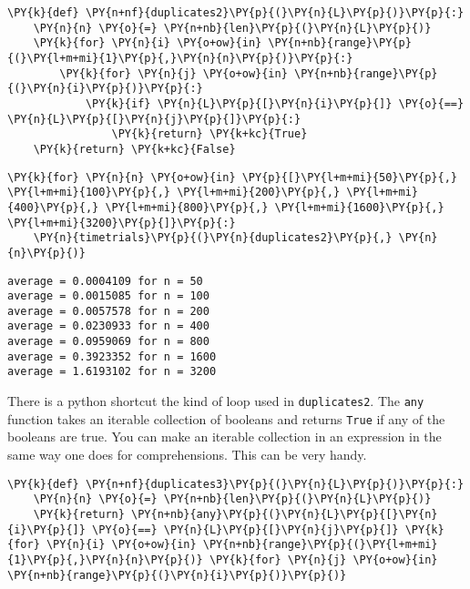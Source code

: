 \begin{Verbatim}[commandchars=\\\{\}]
\PY{k}{def} \PY{n+nf}{duplicates2}\PY{p}{(}\PY{n}{L}\PY{p}{)}\PY{p}{:}
    \PY{n}{n} \PY{o}{=} \PY{n+nb}{len}\PY{p}{(}\PY{n}{L}\PY{p}{)}
    \PY{k}{for} \PY{n}{i} \PY{o+ow}{in} \PY{n+nb}{range}\PY{p}{(}\PY{l+m+mi}{1}\PY{p}{,}\PY{n}{n}\PY{p}{)}\PY{p}{:}
        \PY{k}{for} \PY{n}{j} \PY{o+ow}{in} \PY{n+nb}{range}\PY{p}{(}\PY{n}{i}\PY{p}{)}\PY{p}{:}
            \PY{k}{if} \PY{n}{L}\PY{p}{[}\PY{n}{i}\PY{p}{]} \PY{o}{==} \PY{n}{L}\PY{p}{[}\PY{n}{j}\PY{p}{]}\PY{p}{:}
                \PY{k}{return} \PY{k+kc}{True}
    \PY{k}{return} \PY{k+kc}{False}
\end{Verbatim}



\begin{Verbatim}[commandchars=\\\{\}]
\PY{k}{for} \PY{n}{n} \PY{o+ow}{in} \PY{p}{[}\PY{l+m+mi}{50}\PY{p}{,} \PY{l+m+mi}{100}\PY{p}{,} \PY{l+m+mi}{200}\PY{p}{,} \PY{l+m+mi}{400}\PY{p}{,} \PY{l+m+mi}{800}\PY{p}{,} \PY{l+m+mi}{1600}\PY{p}{,} \PY{l+m+mi}{3200}\PY{p}{]}\PY{p}{:}
    \PY{n}{timetrials}\PY{p}{(}\PY{n}{duplicates2}\PY{p}{,} \PY{n}{n}\PY{p}{)}
\end{Verbatim}

\begin{Verbatim}
average = 0.0004109 for n = 50
average = 0.0015085 for n = 100
average = 0.0057578 for n = 200
average = 0.0230933 for n = 400
average = 0.0959069 for n = 800
average = 0.3923352 for n = 1600
average = 1.6193102 for n = 3200

\end{Verbatim}


There is a python shortcut the kind of loop used in \texttt{duplicates2}.
The \texttt{any} function takes an iterable collection of booleans and returns \texttt{True} if any of the booleans are true.
You can make an iterable collection in an expression in the same way one does for comprehensions.
This can be very handy.

\begin{Verbatim}[commandchars=\\\{\}]
\PY{k}{def} \PY{n+nf}{duplicates3}\PY{p}{(}\PY{n}{L}\PY{p}{)}\PY{p}{:}
    \PY{n}{n} \PY{o}{=} \PY{n+nb}{len}\PY{p}{(}\PY{n}{L}\PY{p}{)}
    \PY{k}{return} \PY{n+nb}{any}\PY{p}{(}\PY{n}{L}\PY{p}{[}\PY{n}{i}\PY{p}{]} \PY{o}{==} \PY{n}{L}\PY{p}{[}\PY{n}{j}\PY{p}{]} \PY{k}{for} \PY{n}{i} \PY{o+ow}{in} \PY{n+nb}{range}\PY{p}{(}\PY{l+m+mi}{1}\PY{p}{,}\PY{n}{n}\PY{p}{)} \PY{k}{for} \PY{n}{j} \PY{o+ow}{in} \PY{n+nb}{range}\PY{p}{(}\PY{n}{i}\PY{p}{)}\PY{p}{)}
\end{Verbatim}



